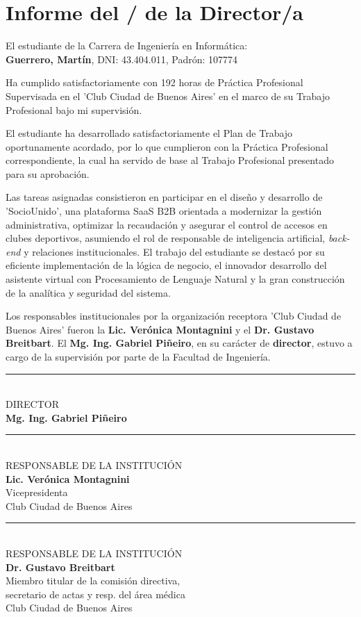 \section{Informe del / de la Director/a}

El estudiante de la Carrera de Ingeniería en Informática: \\ 
\textbf{Guerrero, Martín}, DNI: 43.404.011, Padrón: 107774

Ha cumplido satisfactoriamente con 192 horas de Práctica Profesional Supervisada en el 'Club Ciudad de Buenos Aires' en el marco de su Trabajo Profesional bajo mi supervisión.

El estudiante ha desarrollado satisfactoriamente el Plan de Trabajo oportunamente acordado, por lo que cumplieron con la Práctica Profesional correspondiente, la cual ha servido de base al Trabajo Profesional presentado para su aprobación.

Las tareas asignadas consistieron en participar en el diseño y desarrollo de 'SocioUnido', una plataforma SaaS B2B orientada a modernizar la gestión administrativa, optimizar la recaudación y asegurar el control de accesos en clubes deportivos, asumiendo el rol de responsable de inteligencia artificial, \textit{back-end} y relaciones institucionales. El trabajo del estudiante se destacó por su eficiente implementación de la lógica de negocio, el innovador desarrollo del asistente virtual con Procesamiento de Lenguaje Natural y la gran construcción de la analítica y seguridad del sistema.

Los responsables institucionales por la organización receptora 'Club Ciudad de Buenos Aires' fueron la \textbf{Lic. Verónica Montagnini} y el \textbf{Dr. Gustavo Breitbart}. El \textbf{Mg. Ing. Gabriel Piñeiro}, en su carácter de \textbf{director}, estuvo a cargo de la supervisión por parte de la Facultad de Ingeniería.

\vspace{1.5cm}
\noindent\rule{8cm}{0.4pt} \\
DIRECTOR \\
\textbf{Mg. Ing. Gabriel Piñeiro}

\vspace{1.5cm}
\noindent
\begin{minipage}[t]{0.45\textwidth}
    \centering
    \rule{\linewidth}{0.4pt} \\
    RESPONSABLE DE LA INSTITUCIÓN \\
    \textbf{Lic. Verónica Montagnini} \\
    Vicepresidenta \\
    Club Ciudad de Buenos Aires
\end{minipage}
\hfill
\begin{minipage}[t]{0.45\textwidth}
    \centering
    \rule{\linewidth}{0.4pt} \\
    RESPONSABLE DE LA INSTITUCIÓN \\
    \textbf{Dr. Gustavo Breitbart} \\
    Miembro titular de la comisión directiva, \\
    secretario de actas y resp. del área médica \\
    Club Ciudad de Buenos Aires
\end{minipage}

